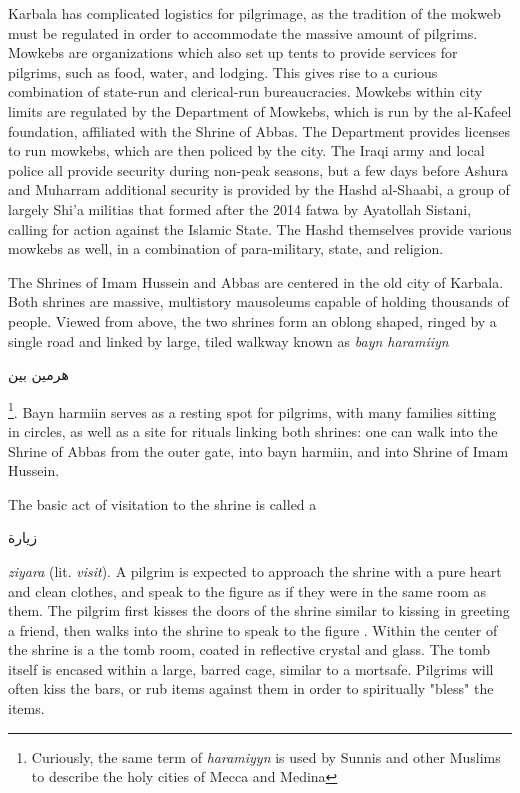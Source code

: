 Karbala has complicated logistics for pilgrimage, as the tradition of the mokweb must be regulated in order to accommodate the massive amount of pilgrims. Mowkebs are organizations which also set up tents to provide services for pilgrims, such as food, water, and lodging. This gives rise to a curious combination of state-run and clerical-run bureaucracies. Mowkebs within city limits are regulated by the Department of Mowkebs, which is run by the al-Kafeel foundation, affiliated with the Shrine of Abbas. The Department provides licenses to run mowkebs, which are then policed by the city. The Iraqi army and local police all provide security during non-peak seasons, but a few days before Ashura and Muharram additional security is provided by the Hashd al-Shaabi, a group of largely Shi'a militias that formed after the 2014 fatwa by Ayatollah Sistani, calling for action against the Islamic State. The Hashd themselves provide various mowkebs as well, in a combination of para-military, state, and religion. 

The Shrines of Imam Hussein and Abbas are centered in the old city of Karbala. Both shrines are massive, multistory mausoleums capable of holding thousands of people. Viewed from above, the two shrines form an oblong shaped, ringed by a single road and linked by large, tiled walkway known as \emph{bayn haramiiyn}\begin{Arabic}هرمين بين\end{Arabic}\footnote{Curiously, the same term of \emph{haramiyyn} is used by Sunnis and other Muslims to describe the holy cities of Mecca and Medina}. Bayn harmiin serves as a resting spot for pilgrims, with many families sitting in circles, as well as a site for rituals linking both shrines: one can walk into the Shrine of Abbas from the outer gate, into bayn harmiin, and into Shrine of Imam Hussein. 

The basic act of visitation to the shrine is called a \begin{Arabic}
    زيارة
\end{Arabic}\emph{ziyara} (lit. \emph{visit}). A pilgrim is expected to approach the shrine with a pure heart and clean clothes, and speak to the figure as if they were in the same room as them. The pilgrim first kisses the doors of the shrine similar to kissing in greeting a friend, then walks into the shrine to speak to the figure \cite{qisa_publications_illustrated_2018}. Within the center of the shrine is a the tomb room, coated in reflective crystal and glass. The tomb itself is encased within a large, barred cage, similar to a mortsafe. Pilgrims will often kiss the bars, or rub items against them in order to spiritually "bless" the items. 

